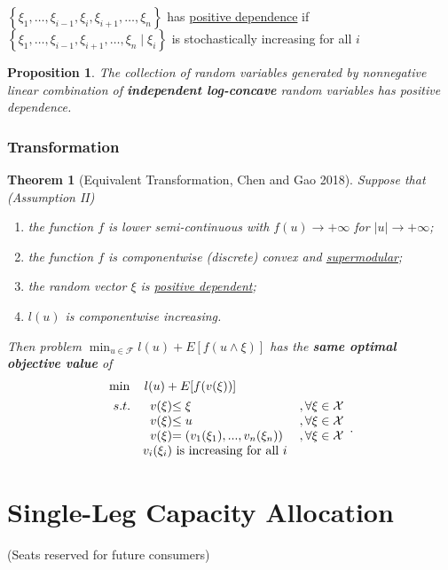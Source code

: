 \documentclass[11pt,a4paper]{article}
\newtheorem{theorem}{Theorem}
\newtheorem{proposition}{Proposition}
\begin{document}
$\left\{\xi_{1}, \ldots, \xi_{i-1}, \xi_{i}, \xi_{i+1}, \ldots, \xi_{n}\right\}$ has \underline{positive dependence} if
$\left\{\xi_{1}, \ldots, \xi_{i-1}, \xi_{i+1}, \ldots, \xi_{n} \mid \xi_{i}\right\}$ is stochastically increasing for all $i$

\begin{proposition}
    The collection of random variables generated by nonnegative linear combination of \textbf{independent log-concave} random variables has positive dependence.
\end{proposition}

\subsubsection{Transformation}
\begin{theorem}[Equivalent Transformation, Chen and Gao 2018]
    Suppose that (Assumption II)
    \begin{enumerate}[(1)]
        \item the function $f$ is lower semi-continuous with $f(u) \rightarrow+\infty$ for $|u| \rightarrow+\infty$;
        \item the function $f$ is componentwise (discrete) convex and \underline{supermodular};
        \item the random vector $\xi$ is \underline{positive dependent};
        \item $l(u)$ is componentwise increasing.
    \end{enumerate}
    Then problem $\min _{u \in \mathcal{F}} l(u)+E[f(u \wedge \xi)]$ has the \textbf{same optimal objective value} of
    \begin{align*}
        &\min\quad l(u)+E[f(v(\xi))]\\
        &\begin{array}{r@{\quad}r@{}l@{\quad}l}
        s.t.
        &v(\xi)&\leq \xi&,\forall \xi\in \mathcal{X}\\
        &v(\xi)&\leq u&,\forall \xi\in \mathcal{X}\\
        &v(\xi)&=(v_1(\xi_1),...,v_n(\xi_n))&, \forall \xi\in \mathcal{X} \\
        &v_i(\xi_i)&\text{ is increasing for all }i&\\
    \end{array} .
\end{align*}
\end{theorem}

\section{Single-Leg Capacity Allocation}
(Seats reserved for future consumers)
\end{document}
